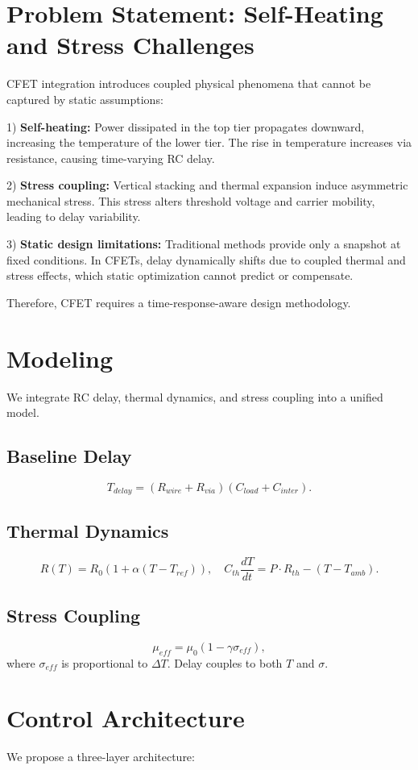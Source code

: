 \documentclass[conference]{IEEEtran}
\begin{document}
\section{Problem Statement: Self-Heating and Stress Challenges}
CFET integration introduces coupled physical phenomena that cannot be captured by static assumptions:  

1) \textbf{Self-heating:} Power dissipated in the top tier propagates downward, increasing the temperature of the lower tier. The rise in temperature increases via resistance, causing time-varying RC delay.  

2) \textbf{Stress coupling:} Vertical stacking and thermal expansion induce asymmetric mechanical stress. This stress alters threshold voltage and carrier mobility, leading to delay variability.  

3) \textbf{Static design limitations:} Traditional methods provide only a snapshot at fixed conditions. In CFETs, delay dynamically shifts due to coupled thermal and stress effects, which static optimization cannot predict or compensate.  

Therefore, CFET requires a time-response-aware design methodology.

\section{Modeling}
We integrate RC delay, thermal dynamics, and stress coupling into a unified model.  

\subsection{Baseline Delay}
\[
T_{delay} = (R_{wire} + R_{via})(C_{load} + C_{inter}).
\]

\subsection{Thermal Dynamics}
\[
R(T) = R_0 \left(1 + \alpha (T - T_{ref}) \right), \quad
C_{th}\frac{dT}{dt} = P\cdot R_{th} - (T - T_{amb}).
\]

\subsection{Stress Coupling}
\[
\mu_{eff} = \mu_0 (1 - \gamma \sigma_{eff}),
\]
where $\sigma_{eff}$ is proportional to $\Delta T$. Delay couples to both $T$ and $\sigma$.

\section{Control Architecture}
We propose a three-layer architecture:  
\end{document}
